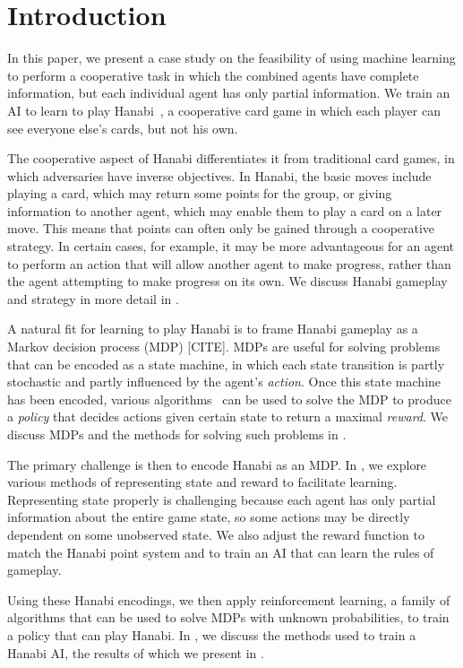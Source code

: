 \section{Introduction}
\label{sec:intro}

In this paper, we present a case study on the feasibility of using machine
learning to perform a cooperative task in which the combined agents have
complete information, but each individual agent has only partial information.
We train an AI to learn to play Hanabi~\cite{hanabiboardgame}, a cooperative
card game in which each player can see everyone else's cards, but not his own.

The cooperative aspect of Hanabi differentiates it from traditional card games,
in which adversaries have inverse objectives. In Hanabi, the basic moves
include playing a card, which may return some points for the group, or giving
information to another agent, which may enable them to play a card on a later
move. This means that points can often only be gained through a cooperative
strategy. In certain cases, for example, it may be more advantageous for an
agent to perform an action that will allow another agent to make progress,
rather than the agent attempting to make progress on its own. We discuss Hanabi
gameplay and strategy in more detail in .

A natural fit for learning to play Hanabi is to frame Hanabi gameplay as a
Markov decision process (MDP) [CITE]. MDPs are useful for solving problems that
can be encoded as a state machine, in which each state transition is partly
stochastic and partly influenced by the agent's \emph{action}. Once this state
machine has been encoded, various algorithms~\cite{TRPO} can be used to solve
the MDP to produce a \emph{policy} that decides actions given certain state to
return a maximal \emph{reward}. We discuss MDPs and the methods for solving
such problems in .

The primary challenge is then to encode Hanabi as an MDP. In
, we explore various methods of representing state and reward
to facilitate learning. Representing state properly is challenging because each
agent has only partial information about the entire game state, so some actions
may be directly dependent on some unobserved state. We also adjust the reward
function to match the Hanabi point system and to train an AI that can learn the
rules of gameplay.

Using these Hanabi encodings, we then apply reinforcement learning, a family of
algorithms that can be used to solve MDPs with unknown probabilities, to train
a policy that can play Hanabi. In , we discuss the
methods used to train a Hanabi AI, the results of which we present in
.

